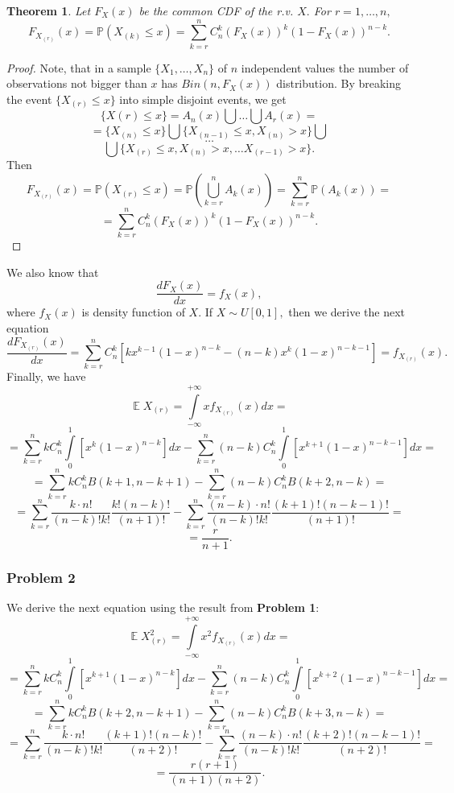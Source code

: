 \documentclass[a4paper, 12pt]{article}
\DeclareMathOperator*{\E}{\mathbb{E}}
\renewcommand*{\P}{\mathbb{P}}
\newtheorem{theorem}{Theorem}
\begin{document}
\begin{theorem}
Let $F_X(x)$ be the common CDF of the r.v. $X.$ For $r = 1, \ldots, n,$
$$
F_{X_{(r)}}(x) = \mathbb{P} (X_{(k)} \leqslant x) = \sum \limits_{k = r}^n C_n^k (F_X (x))^k (1 - F_X (x) )^{n - k}.
$$
\end{theorem}
\begin{proof}
Note, that in a sample $\{X_1, \ldots, X_n\}$ of $n$ independent values the number of observations not bigger than $x$ has $Bin(n, F_X(x))$ distribution.
By breaking the event $\{X_{(r)} \leqslant x\}$ into simple disjoint events, we get
$$
\{X(r) \leqslant x\} = A_n(x) \bigcup \ldots \bigcup A_r(x) = 
$$
$$
 = \{X_{(n)} \leqslant x\} \bigcup \{X_{(n-1)} \leqslant x, X_{(n)} > x\}  \bigcup
$$
$$
\ldots
$$
$$
\bigcup \{X_{(r)} \leqslant x, X_{(n)} > x, \ldots X_{(r - 1)} > x\}.
$$
Then 
$$
F_{X_{(r)}}(x) = \P ( X_{(r)}  \leqslant x ) = \P \left(\mathop{\bigcup} \limits_{k = r}^n  A_k(x) \right) = \sum \limits_{k=r}^n \P(A_k(x)) = 
$$
$$ = \sum \limits_{k = r}^n C_n^k (F_X (x))^k (1 - F_X (x) )^{n - k}.
$$
\end{proof}
\noindent We also know that
$$
\dfrac{d F_X(x)}{dx} = f_X(x),
$$
where $f_X(x)$ is density function of $X.$ 
If $X \sim U[0, 1],$ then we derive the next equation
$$
\dfrac{d F_{X_{(r)}}(x)}{dx} = \sum \limits_{k = r}^n C_n^k [k x^{k-1} (1 - x )^{n - k} - (n - k) x^k (1 - x)^{n - k - 1}] = f_{X_{(r)}}(x).
$$
Finally, we have
$$
\E X_{(r)} = \int \limits_{-\infty}^{+\infty} x f_{X_{(r)}}(x) dx = 
$$
$$
= \sum \limits_{k = r}^n k C_n^k  \int \limits_{0}^{1} [x^k (1 - x )^{n - k}] dx - \sum \limits_{k = r}^n (n - k) C_n^k  \int \limits_{0}^{1} [x^{k+1} (1 - x)^{n - k - 1}] dx = 
$$
$$
= \sum \limits_{k = r}^n k C_n^k  B(k+1, n-k+1) - \sum \limits_{k = r}^n (n - k) C_n^k B(k + 2, n - k) = 
$$
$$
= \sum \limits_{k = r}^n \dfrac{k \cdot n!}{(n-k)! k!}  \dfrac{k! (n-k)!}{(n + 1)!} - \sum \limits_{k = r}^n  \dfrac{(n - k) \cdot n!}{(n-k)! k!}  \dfrac{(k + 1)! (n-k-1)!}{(n+ 1)!} = 
$$
$$
= \dfrac{r}{n+1}.
$$
\subsubsection{Problem 2}
We derive the next equation using the result from \textbf{Problem 1}:
$$
\E X_{(r)}^2 = \int \limits_{-\infty}^{+\infty} x^2 f_{X_{(r)}}(x) dx = 
$$
$$
= \sum \limits_{k = r}^n k C_n^k  \int \limits_{0}^{1} [x^{k+1} (1 - x )^{n - k}] dx - \sum \limits_{k = r}^n (n - k) C_n^k  \int \limits_{0}^{1} [x^{k+2} (1 - x)^{n - k - 1}] dx = 
$$
$$
= \sum \limits_{k = r}^n k C_n^k  B(k+2, n-k+1) - \sum \limits_{k = r}^n (n - k) C_n^k B(k + 3, n - k) = 
$$
$$
= \sum \limits_{k = r}^n \dfrac{k \cdot n!}{(n-k)! k!}  \dfrac{(k+1)! (n-k)!}{(n + 2)!} - \sum \limits_{k = r}^n  \dfrac{(n - k) \cdot n!}{(n-k)! k!}  \dfrac{(k + 2)! (n-k-1)!}{(n+ 2)!} = 
$$
$$
= \dfrac{r (r+1)}{(n+1)(n+2)}.
$$
\end{document}
